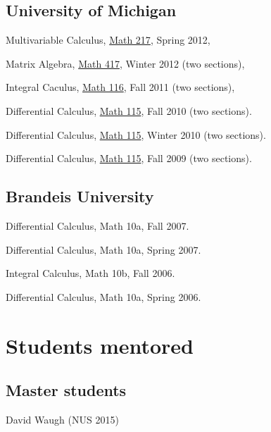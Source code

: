 \documentclass[12pt,a4paper]{article}
\newenvironment{item_list}{
 \begin{list}{}{
   \setlength{\leftmargin}{1.5em}
   \setlength{\itemsep}{0.25em}
   \setlength{\parskip}{0pt}
   \setlength{\parsep}{0.25em}
 }
}{
 \end{list}
}
\begin{document}
\subsection*{University of Michigan}

\begin{item_list}
\item Multivariable Calculus, \href{http://instruct.math.lsa.umich.edu/}{Math 217}, Spring 2012,
\item Matrix Algebra, \href{http://www.math.lsa.umich.edu/courses/undergrad.html#417}{Math 417}, Winter 2012 (two sections),
\item Integral Caculus, \href{http://www.math.lsa.umich.edu/courses/116/}{Math 116}, Fall 2011 (two sections),
\item Differential Calculus, \href{http://www.math.lsa.umich.edu/courses/115/}{Math 115}, Fall 2010 (two sections). 
\item Differential Calculus, \href{http://www.math.lsa.umich.edu/courses/115/}{Math 115}, Winter 2010 (two sections). 
\item Differential Calculus, \href{http://www.math.lsa.umich.edu/courses/115/}{Math 115}, Fall 2009 (two sections).
\end{item_list}

\subsection*{Brandeis University}

\begin{item_list}
\item Differential Calculus, Math 10a,
  Fall 2007. 
\item Differential Calculus, Math 10a,
  Spring 2007. 
\item Integral Calculus, Math 10b,
  Fall 2006.
\item Differential Calculus, Math 10a,
  Spring 2006.
\end{item_list}

\section*{Students mentored}

\subsection*{Master students}

David Waugh (NUS 2015)
\end{document}
